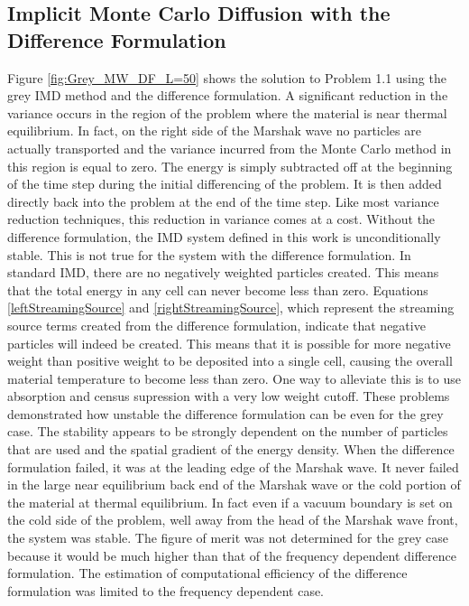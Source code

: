 \belowSubSecSkip
\subsection{Implicit Monte Carlo Diffusion with the Difference Formulation}
\label{sec:Conclusions-Grey-IMD}

\noindent
	\indent Figure \ref{fig:Grey_MW_DF_L=50} shows the solution to Problem 1.1 using the grey IMD method and the difference formulation. A significant reduction in the variance occurs in the region of the problem where the material is near thermal equilibrium. In fact, on the right side of the Marshak wave no particles are actually transported and the variance incurred from the Monte Carlo method in this region is equal to zero. The energy is simply subtracted off at the beginning of the time step during the initial differencing of the problem. It is then added directly back into the problem at the end of the time step. Like most variance reduction techniques, this reduction in variance comes at a cost. Without the difference formulation, the IMD system defined in this work is unconditionally stable. This is not true for the system with the difference formulation. In standard IMD, there are no negatively weighted particles created. This means that the total energy in any cell can never become less than zero. Equations \ref{leftStreamingSource} and \ref{rightStreamingSource}, which represent the streaming source terms created from the difference formulation, indicate that negative particles will indeed be created. This means that it is possible for more negative weight than positive weight to be deposited into a single cell, causing the overall material temperature to become less than zero. One way to alleviate this is to use absorption and census supression with a very low weight cutoff. These problems demonstrated how unstable the difference formulation can be even for the grey case. The stability appears to be strongly dependent on the number of particles that are used and the spatial gradient of the energy density. When the difference formulation failed, it was at the leading edge of the Marshak wave. It never failed in the large near equilibrium back end of the Marshak wave or the cold portion of the material at thermal equilibrium. In fact even if a vacuum boundary is set on the cold side of the problem, well away from the head of the Marshak wave front, the system was stable. The figure of merit was not determined for the grey case because it would be much higher than that of the frequency dependent difference formulation. The estimation of computational efficiency of the difference formulation was limited to the frequency dependent case.

